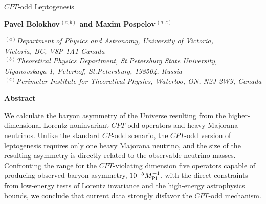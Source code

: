 \documentclass[12pt]{revtex4}
\begin{document}
\begin{titlepage}
\renewcommand{\thefootnote}{\fnsymbol{footnote}}

\setcounter{page}{1}

\vspace*{0.2in}

\begin{center}

\hspace*{-0.6cm}\parbox{17.5cm}{\Large \bf \begin{center}
$CPT$-odd Leptogenesis\end{center}}

\vspace*{0.5cm}
\normalsize


{\bf Pavel Bolokhov$^{\,(a,b)}$ and Maxim Pospelov$^{\,(a,c)}$ }



\smallskip
\medskip

$^{\,(a)}${\it Department of Physics and Astronomy, University of Victoria, \\
     Victoria, BC, V8P 1A1 Canada} \\
$^{\,(b)}${\it Theoretical Physics Department, St.Petersburg State University, Ulyanovskaya 1,
        Peterhof, St.Petersburg, 198504, Russia}\\
$^{\,(c)}${\it Perimeter Institute for Theoretical Physics, Waterloo,
ON, N2J 2W9, Canada}

\smallskip
\end{center}
\vskip0.2in


\centerline{\large\bf Abstract}

We calculate the baryon asymmetry of the Universe resulting from the 
higher-dimensional Lorentz-noninvariant $CPT$-odd operators and heavy 
Majorana neutrinos. Unlike the standard $CP$-odd scenario, the $CPT$-odd version of
leptogenesis requires only one heavy Majorana neutrino, and the size of the 
resulting asymmetry is directly related to the observable neutrino masses. 
Confronting the range for the  $CPT$-violating dimension five operators
capable of producing observed baryon asymmetry, $10^{-5}M_{\rm Pl}^{-1}$, 
with the direct constraints from low-energy tests of Lorentz invariance and the high-energy
astrophysics bounds, we conclude that current data strongly disfavor the $CPT$-odd
mechanism.  


\vfil
{}

\end{titlepage}
\end{document}
